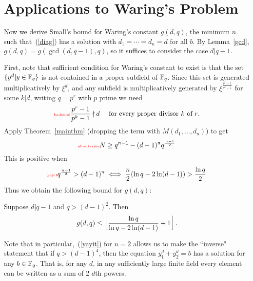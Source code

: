 \section{Applications to Waring's Problem}
Now we derive Small's bound %
for Waring's constant $g(d,q)$, the minimum $n$ such that~(\ref{diag}) has a solution with $d_1=\cdots =d_n=d$ for all $b$. By Lemma~\ref{gcd}, $g(d,q)=g(\gcd(d,q-1),q)$, so it suffices to consider the case $d|q-1$.

First, note that sufficient condition for Waring's constant to exist is that the set $\{y^d|y\in \mathbb{F}_q\}$ is not contained in a proper subfield of $\mathbb{F}_q$. Since this set is generated multiplicatively by $\xi^{d}$, and any subfield is multiplicatively generated by $\xi^{\frac{p^r-1}{p^k-1}}$ for some $k|d$, 
writing $q=p^r$ with $p$ prime we need
\begin{equation}\llabel{badcond}
\frac{p^r-1}{p^k-1}\nmid d
\quad
\text{
 for every proper divisor $k$ of $r$.}
\end{equation}
Apply Theorem~\ref{mainthm} (dropping the term with $M(d_1,\ldots, d_n)$) to get
\begin{equation}\llabel{aboutsame}
N\geq q^{n-1}-(d-1)^nq^{\frac{n-1}{2}}
\end{equation}
This is positive when
\begin{equation}\llabel{yayit}
q^{\frac{n-1}{2}}> (d-1)^n \iff \frac{n}{2}(\ln q-2\ln(d-1))> \frac{\ln q}2
\end{equation}
Thus we obtain the following bound for $g(d,q)$:
\begin{thm}
Suppose $d|q-1$ and $q>(d-1)^2$. Then
\[
g(d,q)\leq \left\lfloor {\frac{\ln q}{\ln q-2\ln(d-1)}+1}\right\rfloor.
\]
\end{thm}
Note that in particular,~(\ref{yayit}) for $n=2$ allows us to make the ``inverse" statement that if $q>(d-1)^4$, then the equation $y_1^d+y_2^d=b$ has a solution for any $b\in \mathbb{F}_q$. That is, for any $d$, in any sufficiently large finite field every element can be written as a sum of 2 $d$th powers.


